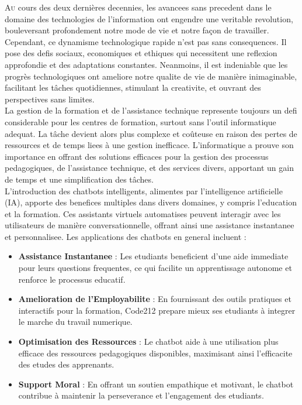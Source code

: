 
\lettrine[nindent=0em, slope=-.5em] {\color{Eblue}A}{u} cours des deux dernières decennies, les avancees sans precedent dans le domaine des technologies de l'information ont engendre une veritable revolution, bouleversant profondement notre mode de vie et notre façon de travailler. Cependant, ce dynamisme technologique rapide n'est pas sans consequences. Il pose des defis sociaux, economiques et ethiques qui necessitent une reflexion approfondie et des adaptations constantes. Neanmoins, il est indeniable que les progrès technologiques ont ameliore notre qualite de vie de manière inimaginable, facilitant les tâches quotidiennes, stimulant la creativite, et ouvrant des perspectives sans limites.
\\

La gestion de la formation et de l'assistance technique represente toujours un defi considerable pour les centres de formation, surtout sans l'outil informatique adequat. La tâche devient alors plus complexe et coûteuse en raison des pertes de ressources et de temps liees à une gestion inefficace. L'informatique a prouve son importance en offrant des solutions efficaces pour la gestion des processus pedagogiques, de l'assistance technique, et des services divers, apportant un gain de temps et une simplification des tâches.
\\
L'introduction des chatbots intelligents, alimentes par l'intelligence artificielle (IA), apporte des benefices multiples dans divers domaines, y compris l'education et la formation. Ces assistants virtuels automatises peuvent interagir avec les utilisateurs de manière conversationnelle, offrant ainsi une assistance instantanee et personnalisee. Les applications des chatbots en general incluent :
\begin{itemize}
    \item \textbf{Assistance Instantanee} : Les etudiants beneficient d'une aide immediate pour leurs questions frequentes, ce qui facilite un apprentissage autonome et renforce le processus educatif.
    \item \textbf{Amelioration de l'Employabilite} : En fournissant des outils pratiques et interactifs pour la formation, Code212 prepare mieux ses etudiants à integrer le marche du travail numerique.
    \item \textbf{Optimisation des Ressources} : Le chatbot aide à une utilisation plus efficace des ressources pedagogiques disponibles, maximisant ainsi l'efficacite des etudes des apprenants.
    \item \textbf{Support Moral} : En offrant un soutien empathique et motivant, le chatbot contribue à maintenir la perseverance et l'engagement des etudiants.
\end{itemize}
\ \\

